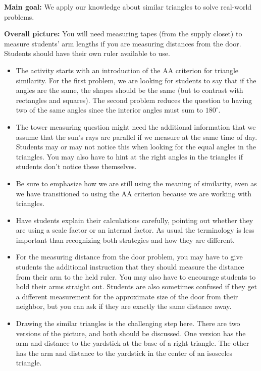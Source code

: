 \documentclass[nooutcomes,noauthor]{ximera}
\begin{document}
\begin{instructorNotes} 


{\bf Main goal:} We apply our knowledge about similar triangles to solve real-world problems.

{\bf Overall picture:} You will need measuring tapes (from the supply closet) to measure students' arm lengths if you are measuring distances from the door. Students should have their own ruler available to use.


\begin{itemize}
	\item The activity starts with an introduction of the AA criterion for triangle similarity. For the first problem, we are looking for students to say that if the angles are the same, the shapes should be the same (but to contrast with rectangles and squares). The second problem reduces the question to having two of the same angles since the interior angles must sum to $180^{\circ}$.
	\item The tower measuring question might need the additional information that we assume that the sun's rays are parallel if we measure at the same time of day. Students may or may not notice this when looking for the equal angles in the triangles. You may also have to hint at the right angles in the triangles if students don't notice these themselves.
	\item Be sure to emphasize how we are still using the meaning of similarity, even as we have transitioned to using the AA criterion because we are working with triangles.
	\item Have students explain their calculations carefully, pointing out whether they are using a scale factor or an internal factor. As usual the terminology is less important than recognizing both strategies and how they are different.
	\item For the measuring distance from the door problem, you may have to give students the additional instruction that they should measure the distance from their arm to the held ruler. You may also have to encourage students to hold their arms straight out. Students are also sometimes confused if they get a different measurement for the approximate size of the door from their neighbor, but you can ask if they are exactly the same distance away.
	\item Drawing the similar triangles is the challenging step here. There are two versions of the picture, and both should be discussed. One version has the arm and distance to the yardstick at the base of a right triangle. The other has the arm and distance to the yardstick in the center of an isosceles triangle.

\end{itemize}
\end{instructorNotes}
\end{document}
